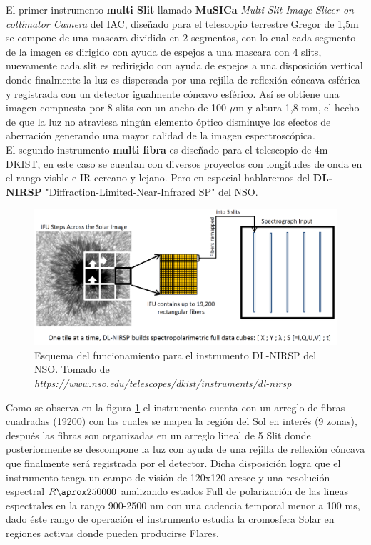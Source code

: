 El primer instrumento \textbf{multi Slit} llamado \textbf{MuSICa} \textit{Multi Slit Image Slicer on collimator Camera} del IAC, diseñado para el telescopio terrestre Gregor de 1,5m se compone de una mascara dividida en 2 segmentos, con lo cual cada segmento de la imagen es dirigido con ayuda de espejos a una mascara con 4 slits, nuevamente cada slit es redirigido con ayuda de espejos a una disposición vertical donde finalmente la luz es dispersada por una rejilla de reflexión cóncava esférica y registrada con un detector igualmente cóncavo esférico. Así se obtiene una imagen compuesta por 8 slits con un ancho de 100 $\mu$m y altura 1,8 mm, el hecho de que la luz no atraviesa ningún elemento óptico disminuye los efectos de aberración generando una mayor calidad de la imagen espectroscópica.\\ 

El segundo instrumento \textbf{multi fibra} es diseñado para el telescopio de 4m DKIST, en este caso se cuentan con diversos proyectos con longitudes de onda en el rango visble e IR cercano y lejano. Pero en especial hablaremos del \textbf{DL-NIRSP} "Diffraction-Limited-Near-Infrared SP" del NSO.

\begin{figure}[H]
\centering
\includegraphics[width=0.70\linewidth]{Kap1/nirsp.png}
\caption{Esquema del funcionamiento para el instrumento DL-NIRSP del NSO. Tomado de \textit{https://www.nso.edu/telescopes/dkist/instruments/dl-nirsp}} 
\label{nirsp}
\end{figure}

Como se observa en la figura \ref{nirsp} el instrumento cuenta con un arreglo de fibras cuadradas (19200) con las cuales se mapea la región del Sol en interés (9 zonas), después las fibras son organizadas en un arreglo lineal de 5 Slit donde posteriormente se descompone la luz con ayuda de una rejilla de reflexión cóncava que finalmente será registrada por el detector. Dicha disposición logra que el instrumento tenga un campo de visión de 120x120 arcsec y una resolución espectral $R\aprox250000$ analizando estados Full de polarización de las lineas espectrales en la rango 900-2500 nm con una cadencia temporal menor a 100 ms, dado éste rango de operación el instrumento estudia la cromosfera Solar en regiones activas donde pueden producirse Flares.\\

